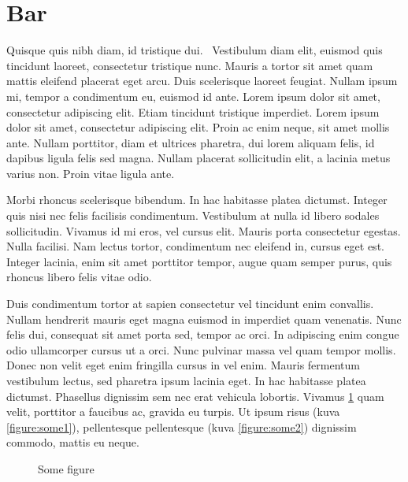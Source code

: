 \documentclass[a4paper, 12pt]{article}
\begin{document}
\clearpage
\section{Bar}
\label{section:bar}

Quisque quis nibh diam, id tristique dui.~\parencite{Doe:2009} Vestibulum diam elit, euismod quis tincidunt laoreet, consectetur tristique nunc. Mauris a tortor sit amet quam mattis eleifend placerat eget arcu. Duis scelerisque laoreet feugiat. Nullam ipsum mi, tempor a condimentum eu, euismod id ante. Lorem ipsum dolor sit amet, consectetur adipiscing elit. Etiam tincidunt tristique imperdiet. Lorem ipsum dolor sit amet, consectetur adipiscing elit. Proin ac enim neque, sit amet mollis ante. Nullam porttitor, diam et ultrices pharetra, dui lorem aliquam felis, id dapibus ligula felis sed magna. Nullam placerat sollicitudin elit, a lacinia metus varius non. Proin vitae ligula ante.~\parencite{Author:06}

Morbi rhoncus scelerisque bibendum. In hac habitasse platea dictumst. Integer quis nisi nec felis facilisis condimentum. Vestibulum at nulla id libero sodales sollicitudin. Vivamus id mi eros, vel cursus elit. Mauris porta consectetur egestas. Nulla facilisi. Nam lectus tortor, condimentum nec eleifend in, cursus eget est. Integer lacinia, enim sit amet porttitor tempor, augue quam semper purus, quis rhoncus libero felis vitae odio.

Duis condimentum tortor at sapien consectetur vel tincidunt enim convallis. Nullam hendrerit mauris eget magna euismod in imperdiet quam venenatis. Nunc felis dui, consequat sit amet porta sed, tempor ac orci. In adipiscing enim congue odio ullamcorper cursus ut a orci. Nunc pulvinar massa vel quam tempor mollis. Donec non velit eget enim fringilla cursus in vel enim. Mauris fermentum vestibulum lectus, sed pharetra ipsum lacinia eget. In hac habitasse platea dictumst. Phasellus dignissim sem nec erat vehicula lobortis. Vivamus \ref{figure:some} quam velit, porttitor a faucibus ac, gravida eu turpis. Ut ipsum risus (kuva \ref{figure:some1}), pellentesque pellentesque (kuva \ref{figure:some2}) dignissim commodo, mattis eu neque.~\parencite{Doe:2010}

\begin{figure}[ht]
	\centering
	\subfloat[Something]{
	\resizebox{0.45\linewidth}{!}{
	\label{figure:some1}
	
	}
	}
	\hfill
	\caption{Some figure}
	\label{figure:some}
\end{figure}
\end{document}

